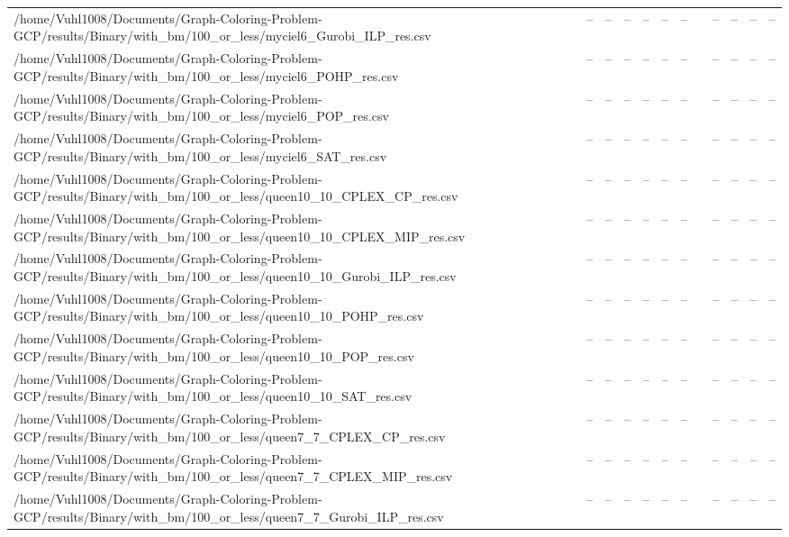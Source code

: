\begin{table}[htbp]
\begin{tabular}{llllllllllll}
/home/Vuhl1008/Documents/Graph-Coloring-Problem-GCP/results/Binary/with\_bm/100\_or\_less/myciel6\_Gurobi\_ILP\_res.csv & -- & -- & -- & -- & -- & -- & {} & -- & -- & -- & -- \\
/home/Vuhl1008/Documents/Graph-Coloring-Problem-GCP/results/Binary/with\_bm/100\_or\_less/myciel6\_POHP\_res.csv & -- & -- & -- & -- & -- & -- & {} & -- & -- & -- & -- \\
/home/Vuhl1008/Documents/Graph-Coloring-Problem-GCP/results/Binary/with\_bm/100\_or\_less/myciel6\_POP\_res.csv & -- & -- & -- & -- & -- & -- & {} & -- & -- & -- & -- \\
/home/Vuhl1008/Documents/Graph-Coloring-Problem-GCP/results/Binary/with\_bm/100\_or\_less/myciel6\_SAT\_res.csv & -- & -- & -- & -- & -- & -- & {} & -- & -- & -- & -- \\
/home/Vuhl1008/Documents/Graph-Coloring-Problem-GCP/results/Binary/with\_bm/100\_or\_less/queen10\_10\_CPLEX\_CP\_res.csv & -- & -- & -- & -- & -- & -- & {} & -- & -- & -- & -- \\
/home/Vuhl1008/Documents/Graph-Coloring-Problem-GCP/results/Binary/with\_bm/100\_or\_less/queen10\_10\_CPLEX\_MIP\_res.csv & -- & -- & -- & -- & -- & -- & {} & -- & -- & -- & -- \\
/home/Vuhl1008/Documents/Graph-Coloring-Problem-GCP/results/Binary/with\_bm/100\_or\_less/queen10\_10\_Gurobi\_ILP\_res.csv & -- & -- & -- & -- & -- & -- & {} & -- & -- & -- & -- \\
/home/Vuhl1008/Documents/Graph-Coloring-Problem-GCP/results/Binary/with\_bm/100\_or\_less/queen10\_10\_POHP\_res.csv & -- & -- & -- & -- & -- & -- & {} & -- & -- & -- & -- \\
/home/Vuhl1008/Documents/Graph-Coloring-Problem-GCP/results/Binary/with\_bm/100\_or\_less/queen10\_10\_POP\_res.csv & -- & -- & -- & -- & -- & -- & {} & -- & -- & -- & -- \\
/home/Vuhl1008/Documents/Graph-Coloring-Problem-GCP/results/Binary/with\_bm/100\_or\_less/queen10\_10\_SAT\_res.csv & -- & -- & -- & -- & -- & -- & {} & -- & -- & -- & -- \\
/home/Vuhl1008/Documents/Graph-Coloring-Problem-GCP/results/Binary/with\_bm/100\_or\_less/queen7\_7\_CPLEX\_CP\_res.csv & -- & -- & -- & -- & -- & -- & {} & -- & -- & -- & -- \\
/home/Vuhl1008/Documents/Graph-Coloring-Problem-GCP/results/Binary/with\_bm/100\_or\_less/queen7\_7\_CPLEX\_MIP\_res.csv & -- & -- & -- & -- & -- & -- & {} & -- & -- & -- & -- \\
/home/Vuhl1008/Documents/Graph-Coloring-Problem-GCP/results/Binary/with\_bm/100\_or\_less/queen7\_7\_Gurobi\_ILP\_res.csv & -- & -- & -- & -- & -- & -- & {} & -- & -- & -- & -- \\

\end{tabular}
\end{table}
